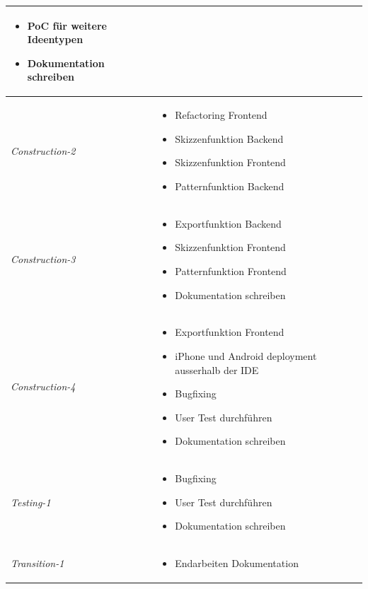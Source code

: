 \begin{center}
\begin{longtable}{| l | p{10cm} |}
\begin{itemize}[noitemsep]
				\item PoC für weitere Ideentypen
				\item Dokumentation schreiben
			\end{itemize}\\
		\hline
		\textit{Construction-2 } & 
			\begin{itemize}[noitemsep]
				\item Refactoring Frontend
				\item Skizzenfunktion Backend
				\item Skizzenfunktion Frontend
				\item Patternfunktion Backend
			\end{itemize}\\
		\hline
		\textit{Construction-3 } & 
			\begin{itemize}[noitemsep]
				\item Exportfunktion Backend
				\item Skizzenfunktion Frontend
				\item Patternfunktion Frontend
				\item Dokumentation schreiben
			\end{itemize}\\
		\hline
		\textit{Construction-4 } & 
			\begin{itemize}[noitemsep]
				\item Exportfunktion Frontend
				\item iPhone und Android deployment ausserhalb der IDE
				\item Bugfixing
				\item User Test durchführen
				\item Dokumentation schreiben
			\end{itemize}\\
		\hline
		\textit{Testing-1 } & 
			\begin{itemize}[noitemsep]
				\item Bugfixing
				\item User Test durchführen
				\item Dokumentation schreiben
			\end{itemize}\\
		\hline
		\textit{Transition-1 } & 
			\begin{itemize}[noitemsep]
				\item Endarbeiten Dokumentation
			\end{itemize}\\
		\hline

	\end{longtable}
\end{center}

